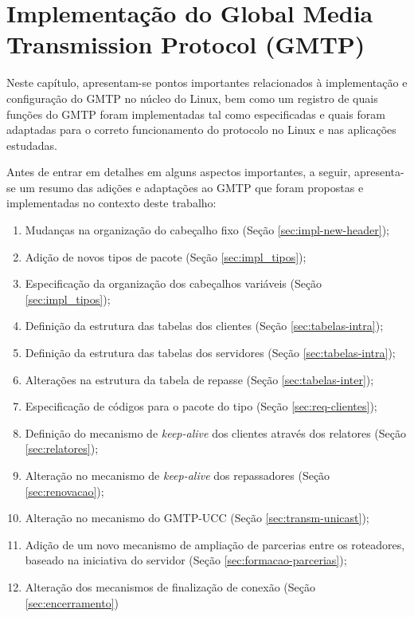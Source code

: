 \chapter{Implementação do Global Media Transmission Protocol (GMTP)}
\label{cap:aplicabilidade}

Neste capítulo, apresentam-se pontos importantes relacionados à implementação e configuração do GMTP no núcleo do Linux, bem como um registro de quais funções do GMTP foram implementadas tal como especificadas e quais foram adaptadas para o correto funcionamento do protocolo no Linux e nas aplicações estudadas.

Antes de entrar em detalhes em alguns aspectos importantes, a seguir, apresenta-se um resumo das adições e adaptações ao GMTP que foram propostas e implementadas no contexto deste trabalho:

\begin{enumerate}
\item Mudanças na organização do cabeçalho fixo (Seção \ref{sec:impl-new-header});
\item Adição de novos tipos de pacote (Seção \ref{sec:impl_tipos});
\item Especificação da organização dos cabeçalhos variáveis (Seção \ref{sec:impl_tipos});
\item Definição da estrutura das tabelas dos clientes (Seção \ref{sec:tabelas-intra});
\item Definição da estrutura das tabelas dos servidores (Seção \ref{sec:tabelas-intra});
\item Alterações na estrutura da tabela de repasse (Seção \ref{sec:tabelas-inter});
\item Especificação de códigos para o pacote do tipo  (Seção \ref{sec:req-clientes});
\item Definição do mecanismo de \textit{keep-alive} dos clientes através dos relatores (Seção \ref{sec:relatores});
\item Alteração no mecanismo de \textit{keep-alive} dos repassadores (Seção \ref{sec:renovacao});
\item Alteração no mecanismo do GMTP-UCC (Seção \ref{sec:transm-unicast});
\item Adição de um novo mecanismo de ampliação de parcerias entre os roteadores, baseado na iniciativa do servidor (Seção \ref{sec:formacao-parcerias});
\item Alteração dos mecanismos de finalização de conexão (Seção \ref{sec:encerramento})
\end{enumerate}

